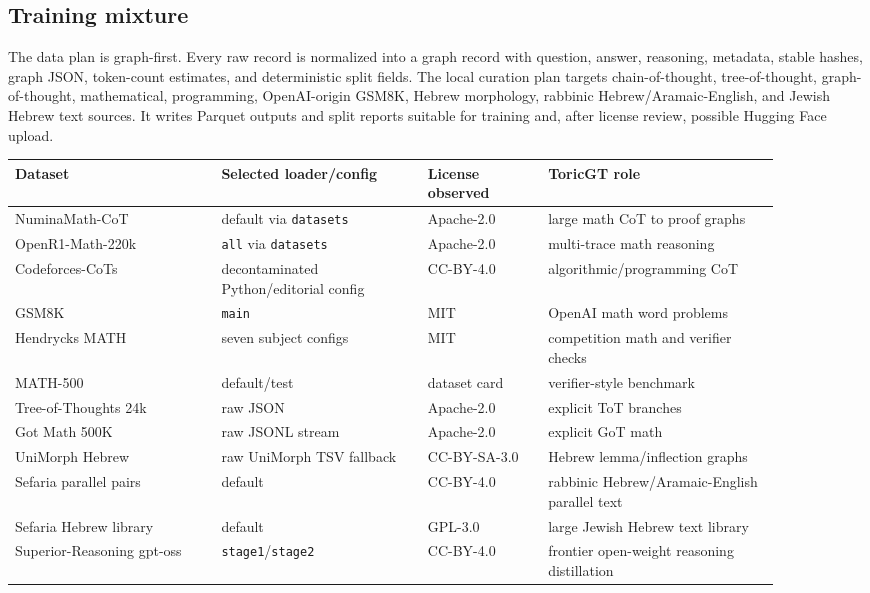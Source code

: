 \documentclass[11pt]{article}
\theoremstyle{definition}
\theoremstyle{plain}
\theoremstyle{remark}
\numberwithin{equation}{section}
\begin{document}
\subsection{Training mixture}

The data plan is graph-first.  Every raw record is normalized into a graph record with question, answer, reasoning, metadata, stable hashes, graph JSON, token-count estimates, and deterministic split fields.  The local curation plan targets chain-of-thought, tree-of-thought, graph-of-thought, mathematical, programming, OpenAI-origin GSM8K, Hebrew morphology, rabbinic Hebrew/Aramaic-English, and Jewish Hebrew text sources.  It writes Parquet outputs and split reports suitable for training and, after license review, possible Hugging Face upload.

{\small
\begin{longtable}{>{\raggedright\arraybackslash}p{0.24\linewidth}>{\raggedright\arraybackslash}p{0.24\linewidth}>{\raggedright\arraybackslash}p{0.14\linewidth}>{\raggedright\arraybackslash}p{0.27\linewidth}}
\toprule
Dataset & Selected loader/config & License observed & ToricGT role \\
\midrule
\endhead
NuminaMath-CoT & default via \texttt{datasets} & Apache-2.0 & large math CoT to proof graphs \\
OpenR1-Math-220k & \texttt{all} via \texttt{datasets} & Apache-2.0 & multi-trace math reasoning \\
Codeforces-CoTs & decontaminated Python/editorial config & CC-BY-4.0 & algorithmic/programming CoT \\
GSM8K & \texttt{main} & MIT & OpenAI math word problems \\
Hendrycks MATH & seven subject configs & MIT & competition math and verifier checks \\
MATH-500 & default/test & dataset card & verifier-style benchmark \\
Tree-of-Thoughts 24k & raw JSON & Apache-2.0 & explicit ToT branches \\
Got Math 500K & raw JSONL stream & Apache-2.0 & explicit GoT math \\
UniMorph Hebrew & raw UniMorph TSV fallback & CC-BY-SA-3.0 & Hebrew lemma/inflection graphs \\
Sefaria parallel pairs & default & CC-BY-4.0 & rabbinic Hebrew/Aramaic-English parallel text \\
Sefaria Hebrew library & default & GPL-3.0 & large Jewish Hebrew text library \\
Superior-Reasoning gpt-oss & \texttt{stage1}/\texttt{stage2} & CC-BY-4.0 & frontier open-weight reasoning distillation \\

\end{longtable}}
\end{document}
